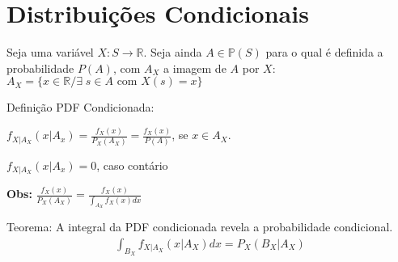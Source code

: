 \documentclass{article}
\renewcommand\bf[1]{\textbf{#1}}
\begin{document}
\section{Distribuições Condicionais}
Seja uma variável $X: S \rightarrow \mathbb{R}$. Seja ainda $A \in \mathbb{P}(S)$ para o qual é
definida a probabilidade $P(A)$, com $A_X$ a imagem de $A$ por $X$: $A_X = \{x \in \mathbb{R} /
    \exists \; s \in A \text{ com } X(s) = x\}$

Definição PDF Condicionada:

$f_{X|A_X}(x|A_x) = \frac{f_X(x)}{P_X(A_X)} = \frac{f_X(x)}{P(A)}$, se $x \in A_X$.

$f_{X|A_X}(x|A_x) = 0$, caso contário

\bf{Obs:} $\frac{f_X(x)}{P_X(A_X)} = \frac{f_X(x)}{\int_{A_X} f_X(x)dx}$

Teorema: A integral da PDF condicionada revela a probabilidade condicional.
\begin{align*}
    \int_{B_X} f_{X|A_X}(x|A_X)dx = P_X(B_X|A_X)
\end{align*}
\end{document}
